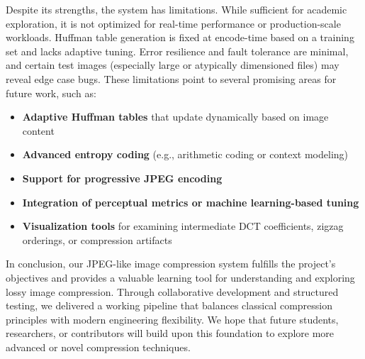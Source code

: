 Despite its strengths, the system has limitations. While sufficient for academic exploration, it is not optimized for real-time performance or production-scale workloads. Huffman table generation is fixed at encode-time based on a training set and lacks adaptive tuning. Error resilience and fault tolerance are minimal, and certain test images (especially large or atypically dimensioned files) may reveal edge case bugs. These limitations point to several promising areas for future work, such as:

\begin{itemize}
    \item \textbf{Adaptive Huffman tables} that update dynamically based on image content
    \item \textbf{Advanced entropy coding} (e.g., arithmetic coding or context modeling)
    \item \textbf{Support for progressive JPEG encoding}
    \item \textbf{Integration of perceptual metrics or machine learning-based tuning}
    \item \textbf{Visualization tools} for examining intermediate DCT coefficients, zigzag orderings, or compression artifacts
\end{itemize}

In conclusion, our JPEG-like image compression system fulfills the project’s objectives and provides a valuable learning tool for understanding and exploring lossy image compression. Through collaborative development and structured testing, we delivered a working pipeline that balances classical compression principles with modern engineering flexibility. We hope that future students, researchers, or contributors will build upon this foundation to explore more advanced or novel compression techniques.